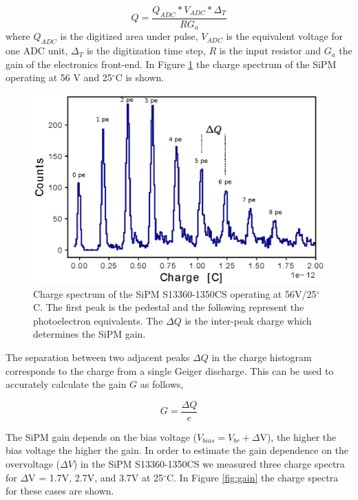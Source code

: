 \documentclass[a4paper,11pt]{article}
\begin{document}
\begin{equation}
\label{eq:y:3}
Q = \frac{Q_{ADC}*V_{ADC}*\Delta_T}{RG_a}
\end{equation}
where $Q_{ADC}$ is the digitized area under pulse, $V_{ADC}$ is the equivalent voltage for one ADC unit, $\Delta_T$ is the digitization time step, $R$ is the input resistor and $G_a$ the gain of the electronics front-end. In Figure \ref{fig:charge} the charge spectrum of the SiPM operating at 56 V and 25$^{\circ}$C is shown.


\begin{figure}[htbp]
\centering %
\includegraphics[width=.65\textwidth]{Figures/Charge.eps}
\caption{\label{fig:charge} Charge spectrum of the SiPM S13360-1350CS operating at 56V/25$^{\circ}$C. The first peak is the pedestal and the following represent the photoelectron equivalents. The $\Delta Q$ is the inter-peak charge which determines the SiPM gain.}
\end{figure}

The separation between two adjacent peaks $\Delta Q$ in the charge histogram corresponds to the charge from a single Geiger discharge. This can be used to accurately calculate the gain $G$ as follows,

\begin{equation}
\label{eq:y:3}
G = \frac{\Delta Q}{e}
\end{equation}

The SiPM gain depends on the bias voltage ($V_{bias} = V_{br} + \Delta$V), the higher the bias voltage the higher the gain. In order to estimate the gain dependence on the overvoltage ($\Delta V$) in the SiPM S13360-1350CS we measured three charge spectra for $\Delta$V = 1.7V, 2.7V, and 3.7V at 25$^{\circ}$C. In Figure \ref{fig:gain} the charge spectra for these cases are shown.
\end{document}

